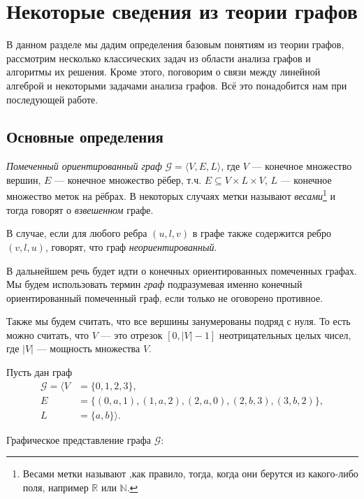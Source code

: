 \chapter{Некоторые сведения из теории графов}\label{chpt:GraphTheoryIntro}

В данном разделе мы дадим определения базовым понятиям из теории графов, рассмотрим несколько классических задач из области анализа графов и алгоритмы их решения. Кроме этого, поговорим о связи между линейной алгеброй и некоторыми задачами анализа графов.
Всё это понадобится нам при последующей работе.

\section{Основные определения}

\begin{definition}
  \textit{Помеченный ориентированный граф} $\mathcal{G} = \langle V, E, L \rangle$, где $V$ --- конечное множество вершин, $E$ --- конечное множество рёбер, т.ч. $E \subseteq V \times L \times V$, $L$ --- конечное множество меток на рёбрах. В некоторых случаях метки называют \textit{весами}\footnote{Весами метки называют ,как правило, тогда, когда они берутся из какого-либо поля, например $\mathbb{R}$ или $\mathbb{N}$.} и тогда говорят о \textit{взвешенном} графе.
\end{definition}


\begin{definition}
  В случае, если для любого ребра $(u,l,v)$ в графе также содержится ребро $(v,l,u)$, говорят, что граф \textit{неориентированный}.
\end{definition}


В дальнейшем речь будет идти о конечных ориентированных помеченных графах.
Мы будем использовать термин \textit{граф} подразумевая именно конечный ориентированный помеченный граф, если только не оговорено противное.

Также мы будем считать, что все вершины занумерованы подряд с нуля.
То есть можно считать, что $V$ --- это отрезок $[0, |V| - 1]$ неотрицательных целых чисел, где $|V|$ --- мощность множества $V$.

\begin{example}
  Пусть дан граф 
  \begin{align*}
    \mathcal{G} = \langle V&=\{0,1,2,3\},\\
                            E&=\{(0,a,1), (1,a,2), (2,a,0), (2,b,3), (3,b,2)\}, \\
                            L&=\{a,b\} \rangle.
  \end{align*}

  Графическое представление графа $\mathcal{G}$:
  \begin{center}
  
  \end{center}
\end{example}

